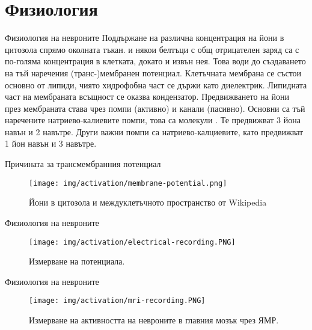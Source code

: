 \section{Физиология}
\begin{frame}[t]{Физиология на невроните}
  Поддържане на различна концентрация на йони в цитозола спрямо околната тъкан.
   и някои белтъци с общ отрицателен заряд са с по-голяма концентрация в клетката,
  докато  и  извън нея. Това води до създаването на тъй наречения (транс-)мембранен потенциал.
  Клетъчната мембрана се състои основно от липиди, чиято хидрофобна част се държи като диелектрик.
  Липидната част на мембраната всъщност се оказва кондензатор.
  Предвижването на йони през мембраната става чрез помпи (активно) и канали (пасивно).
  Основни са тъй наречените натриево-калиевите помпи, това са молекули . Те предвижват 3  йона навън и 2  навътре.
  Други важни помпи са натриево-калциевите, като предвижват 1  йон навън и 3  навътре.
\end{frame}

\begin{frame}[t]{Причината за трансмембранния потенциал}
  \begin{figure}[htbp!]
    \centering
    \texttt{[image: img/activation/membrane-potential.png]}
    \caption{Йони в цитозола и междуклетъчното пространство от Wikipedia}
  \end{figure}
\end{frame}

\begin{frame}[t]{Физиология на невроните}
  \begin{figure}[htbp!]
    \centering
    \texttt{[image: img/activation/electrical-recording.PNG]}
    \caption{Измерване на потенциала. \cite[Фиг 1.7]{Neuron}}
  \end{figure}
\end{frame}

\begin{frame}[t]{Физиология на невроните}
  \begin{figure}[htbp!]
    \centering
    \texttt{[image: img/activation/mri-recording.PNG]}
    \caption{Измерване на активността на невроните в главния мозък чрез ЯМР. \cite[Фиг 1.9]{Neuron}}
  \end{figure}
\end{frame}

